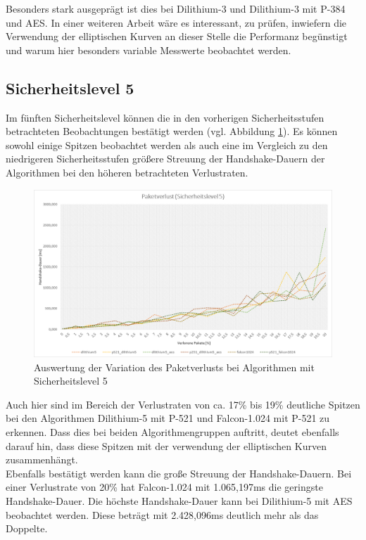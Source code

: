 		Besonders stark ausgeprägt ist dies bei Dilithium-3 und Dilithium-3 mit P-384 und AES. In einer weiteren Arbeit wäre es interessant, zu prüfen, 				inwiefern die Verwendung der elliptischen Kurven an dieser Stelle die Performanz begünstigt und warum hier besonders variable Messwerte beobachtet 				werden.
		
		\subsection{Sicherheitslevel 5}
		\label{subsec:ergebnis:verlust:sl5}
		
		Im fünften Sicherheitslevel können die in den vorherigen Sicherheitsstufen betrachteten Beobachtungen bestätigt werden (vgl. Abbildung 							\ref{fig:ergebnis:verlust:sl5}). Es können sowohl einige Spitzen beobachtet werden als auch eine im Vergleich zu den niedrigeren Sicherheitsstufen 				größere Streuung der Handshake-Dauern der Algorithmen bei den höheren betrachteten Verlustraten.
		
		\begin{figure}[htbp]
			\centering
			\includegraphics[width=\textwidth]{../auswertung/verlust_sl5.png}
			\caption{Auswertung der Variation des Paketverlusts bei Algorithmen mit Sicherheitslevel 5}
			\label{fig:ergebnis:verlust:sl5}
		\end{figure}
		
		Auch hier sind im Bereich der Verlustraten von ca. 17\% bis 19\% deutliche Spitzen bei den Algorithmen Dilithium-5 mit P-521 und Falcon-1.024 mit 				P-521 zu erkennen. Dass dies bei beiden Algorithmengruppen auftritt, deutet ebenfalls darauf hin, dass diese Spitzen mit der verwendung der 					elliptischen Kurven zusammenhängt.\\
		
		Ebenfalls bestätigt werden kann die große Streuung der Handshake-Dauern. Bei einer Verlustrate von 20\% hat Falcon-1.024 mit 1.065,197ms die 					geringste Handshake-Dauer. Die höchste Handshake-Dauer kann bei Dilithium-5 mit AES beobachtet werden. Diese beträgt mit 2.428,096ms deutlich mehr 				als das Doppelte.\\
		
